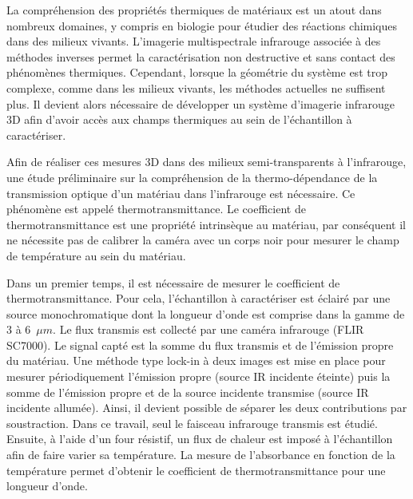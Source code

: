 {\normalsize
La compréhension des propriétés thermiques de matériaux est un atout dans nombreux domaines, y compris en biologie pour étudier des réactions chimiques dans des milieux vivants. L'imagerie multispectrale infrarouge associée à des méthodes inverses permet la caractérisation non destructive et sans contact des phénomènes thermiques. Cependant, lorsque la géométrie du système est trop complexe, comme dans les milieux vivants, les méthodes actuelles ne suffisent plus. Il devient alors nécessaire de développer un système d'imagerie infrarouge 3D afin d'avoir accès aux champs thermiques au sein de l'échantillon à caractériser.







Afin de réaliser ces mesures 3D dans des milieux semi-transparents à l'infrarouge, une étude préliminaire sur la compréhension de la thermo-dépendance de la transmission optique d'un matériau dans l'infrarouge est nécessaire. Ce phénomène est appelé thermotransmittance. Le coefficient de thermotransmittance est une propriété intrinsèque au matériau, par conséquent il ne nécessite pas de calibrer la caméra avec un corps noir pour mesurer le champ de température au sein du matériau. 







Dans un premier temps, il est nécessaire de mesurer le coefficient de thermotransmittance. Pour cela, l'échantillon à caractériser est éclairé par une source monochromatique dont la longueur d'onde est comprise dans la gamme de 3 à 6~$\unit{\mu m}$. Le flux transmis est collecté par une caméra infrarouge (FLIR SC7000). Le signal capté est la somme du flux transmis et de l'émission propre du matériau. Une méthode type lock-in à deux images est mise en place pour mesurer périodiquement l'émission propre (source IR incidente éteinte) puis la somme de l'émission propre et de la source incidente transmise (source IR incidente allumée). Ainsi, il devient possible de séparer les deux contributions par soustraction. Dans ce travail, seul le faisceau infrarouge transmis est étudié. Ensuite, à l'aide d'un four résistif, un flux de chaleur est imposé à l'échantillon afin de faire varier sa température. La mesure de l'absorbance en fonction de la température permet d'obtenir le coefficient de thermotransmittance pour une longueur d'onde. 







}
